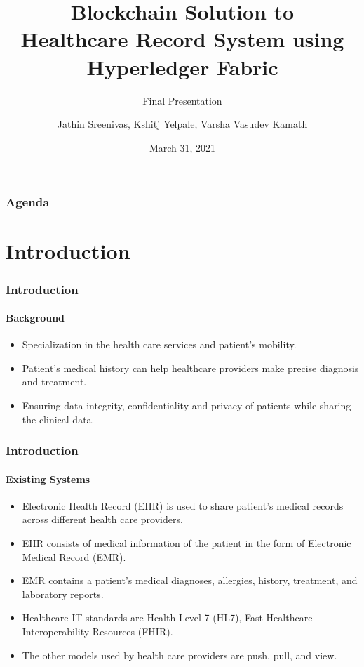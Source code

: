 \documentclass[english,hangout]{beamer}
\title{Blockchain Solution to \\Healthcare Record System using \\ Hyperledger Fabric}
\subtitle{Final Presentation}
\author{Jathin Sreenivas, Kshitj Yelpale, Varsha Vasudev Kamath}
\date{March 31, 2021}
\begin{document}
\begin{frame}
\titlepage
\end{frame}



\begin{frame}
   \frametitle{Agenda}
   \tableofcontents%
\end{frame}



\section{Introduction}




\begin{frame}[fragile]
 \frametitle{Introduction}
 \framesubtitle{Background}
 \begin{itemize}
     \item Specialization in the health care services and patient’s mobility.
     \item Patient’s medical history can help healthcare providers make precise diagnosis and treatment.
     \item Ensuring data integrity, confidentiality and privacy of patients while sharing the clinical data.
 \end{itemize}
\end{frame}



\begin{frame}[fragile]
 \frametitle{Introduction}
 \framesubtitle{Existing Systems}
 \begin{itemize}
     \item Electronic Health Record (EHR) is used to share patient's medical records across different health care providers.
     \item EHR consists of medical information of the patient
in the form of Electronic Medical Record (EMR).
     \item EMR contains a patient’s
medical diagnoses, allergies, history, treatment, and laboratory reports.
     \item Healthcare IT standards are Health Level
7 (HL7), Fast Healthcare Interoperability Resources (FHIR).
\item The other models used by health care providers are push, pull, and view.
 \end{itemize}
\end{frame}
\end{document}
